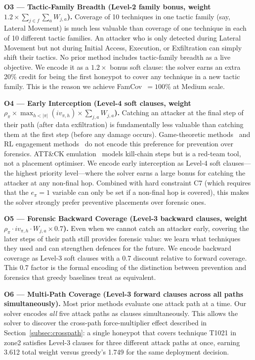 \documentclass[journal]{IEEEtran}
\begin{document}
\medskip
\noindent\textbf{O3 --- Tactic-Family Breadth (Level-2
family bonus, weight $1.2 \times \sum_{j \in f}\sum_a
W_{j,a}$).}
Coverage of 10 techniques in one tactic family (say, Lateral
Movement) is much less valuable than coverage of one
technique in each of 10 different tactic families.
An attacker who is only detected during Lateral Movement
but not during Initial Access, Execution, or Exfiltration
can simply shift their tactics.
No prior method includes tactic-family breadth as a live
objective.
We encode it as a $1.2\times$ bonus soft clause: the solver
earns an extra 20\% credit for being the first honeypot to
cover any technique in a new tactic family.
This is the reason we achieve FamCov~$= 100\%$ at Medium
scale.

\medskip
\noindent\textbf{O4 --- Early Interception (Level-4 soft
clauses, weight $\rho_\pi \times \max_{h<|\pi|}(iv_{\pi,h})
\times \sum_{j,a} W_{j,a}$).}
Catching an attacker at the final step of their path (after
data exfiltration) is fundamentally less valuable than
catching them at the first step (before any damage occurs).
Game-theoretic methods~\cite{kiekintveld2015,pawlick2019}
and RL engagement methods~\cite{huang2019} do not encode
this preference for prevention over forensics.
ATT\&CK emulation~\cite{applebaum2016} models kill-chain
steps but is a red-team tool, not a placement optimiser.
We encode early interception as Level-4 soft clauses---the
highest priority level---where the solver earns a large
bonus for catching the attacker at any non-final hop.
Combined with hard constraint C7 (which requires that the
$e_\pi = 1$ variable can only be set if a non-final hop is
covered), this makes the solver strongly prefer preventive
placements over forensic ones.

\medskip
\noindent\textbf{O5 --- Forensic Backward Coverage (Level-3
backward clauses, weight $\rho_\pi \cdot iv_{\pi,h} \cdot
W_{j,a} \times 0.7$).}
Even when we cannot catch an attacker early, covering the
later steps of their path still provides forensic value:
we learn what techniques they used and can strengthen
defences for the future.
We encode backward coverage as Level-3 soft clauses with a
0.7 discount relative to forward coverage.
This 0.7 factor is the formal encoding of the distinction
between prevention and forensics that greedy baselines
treat as equivalent.

\medskip
\noindent\textbf{O6 --- Multi-Path Coverage (Level-3 forward
clauses across all paths simultaneously).}
Most prior methods evaluate one attack path at a time.
Our solver encodes \emph{all} five attack paths as clauses
simultaneously.
This allows the solver to discover the cross-path
force-multiplier effect described in
Section~\ref{subsec:crosspath}: a single honeypot that
covers technique T1021 in zone2 satisfies Level-3 clauses
for three different attack paths at once, earning 3.612
total weight versus greedy's 1.749 for the same deployment
decision.
\end{document}
